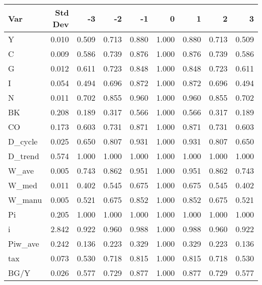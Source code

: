 \begin{tabular}{lrrrrrrrr}
\toprule
Var & Std Dev & -3 & -2 & -1 & 0 & 1 & 2 & 3 \\
\midrule
Y & 0.010 & 0.509 & 0.713 & 0.880 & 1.000 & 0.880 & 0.713 & 0.509 \\
C & 0.009 & 0.586 & 0.739 & 0.876 & 1.000 & 0.876 & 0.739 & 0.586 \\
G & 0.012 & 0.611 & 0.723 & 0.848 & 1.000 & 0.848 & 0.723 & 0.611 \\
I & 0.054 & 0.494 & 0.696 & 0.872 & 1.000 & 0.872 & 0.696 & 0.494 \\
N & 0.011 & 0.702 & 0.855 & 0.960 & 1.000 & 0.960 & 0.855 & 0.702 \\
BK & 0.208 & 0.189 & 0.317 & 0.566 & 1.000 & 0.566 & 0.317 & 0.189 \\
CO & 0.173 & 0.603 & 0.731 & 0.871 & 1.000 & 0.871 & 0.731 & 0.603 \\
D_cycle & 0.025 & 0.650 & 0.807 & 0.931 & 1.000 & 0.931 & 0.807 & 0.650 \\
D_trend & 0.574 & 1.000 & 1.000 & 1.000 & 1.000 & 1.000 & 1.000 & 1.000 \\
W_ave & 0.005 & 0.743 & 0.862 & 0.951 & 1.000 & 0.951 & 0.862 & 0.743 \\
W_med & 0.011 & 0.402 & 0.545 & 0.675 & 1.000 & 0.675 & 0.545 & 0.402 \\
W_manu & 0.005 & 0.521 & 0.675 & 0.852 & 1.000 & 0.852 & 0.675 & 0.521 \\
Pi & 0.205 & 1.000 & 1.000 & 1.000 & 1.000 & 1.000 & 1.000 & 1.000 \\
i & 2.842 & 0.922 & 0.960 & 0.988 & 1.000 & 0.988 & 0.960 & 0.922 \\
Piw_ave & 0.242 & 0.136 & 0.223 & 0.329 & 1.000 & 0.329 & 0.223 & 0.136 \\
tax & 0.073 & 0.530 & 0.718 & 0.815 & 1.000 & 0.815 & 0.718 & 0.530 \\
BG/Y & 0.026 & 0.577 & 0.729 & 0.877 & 1.000 & 0.877 & 0.729 & 0.577 \\
\bottomrule
\end{tabular}
